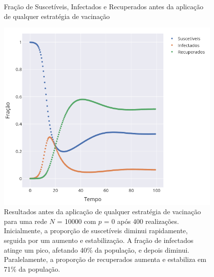\begin{figure}[H]
    \centering
    \captionsetup{font=normalsize,skip=0.8pt,singlelinecheck=on,labelsep=endash}
    \caption{Fração de Suscetíveis, Infectados e Recuperados antes da aplicação de qualquer estratégia de vacinação}
    \includegraphics[scale= 0.5]{figuras/pre_vacina_nponderado.png}
    \captionsetup{font=small,justification=justified}
    \caption*{Resultados antes da aplicação de qualquer 
    estratégia de vacinação para uma rede $N$ = 10000 com $p $ = 0 após 400 realizações. Inicialmente, a proporção de suscetíveis diminui rapidamente, seguida por um aumento e estabilização. A fração de infectados atinge um pico, afetando 
    40\% da população, e depois diminui. Paralelamente, a proporção de recuperados aumenta e estabiliza em 71\% da população.}
    \label{fig:pre_vacina}
\end{figure}


